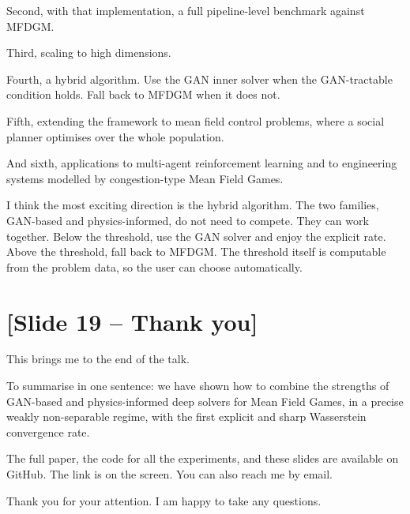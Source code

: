 \documentclass[11pt]{article}
\begin{document}
Second, with that implementation, a full pipeline-level benchmark against
MFDGM.

Third, scaling to high dimensions.

Fourth, a hybrid algorithm. Use the GAN inner solver when the GAN-tractable
condition holds. Fall back to MFDGM when it does not.

Fifth, extending the framework to mean field control problems, where a
social planner optimises over the whole population.

And sixth, applications to multi-agent reinforcement learning and to
engineering systems modelled by congestion-type Mean Field Games.

I think the most exciting direction is the hybrid algorithm. The two
families, GAN-based and physics-informed, do not need to compete. They
can work together. Below the threshold, use the GAN solver and enjoy the
explicit rate. Above the threshold, fall back to MFDGM. The threshold
itself is computable from the problem data, so the user can choose
automatically.

\section*{[Slide 19 -- Thank you]}

This brings me to the end of the talk.

To summarise in one sentence: we have shown how to combine the strengths
of GAN-based and physics-informed deep solvers for Mean Field Games, in
a precise weakly non-separable regime, with the first explicit and sharp
Wasserstein convergence rate.

The full paper, the code for all the experiments, and these slides are
available on GitHub. The link is on the screen. You can also reach me
by email.

Thank you for your attention. I am happy to take any questions.
\end{document}
